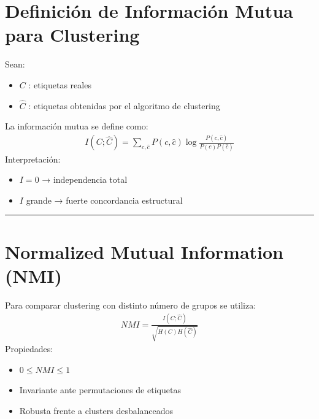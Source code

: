 \documentclass[letterpaper,10pt,english]{jupyterBook}
\begin{document}
\section{Definición de Información Mutua para Clustering}
\label{\detokenize{04_data_science_applications/clustering_mi:definicion-de-informacion-mutua-para-clustering}}
\sphinxAtStartPar
Sean:
\begin{itemize}
\item {} 
\sphinxAtStartPar
\(C\) : etiquetas reales

\item {} 
\sphinxAtStartPar
\(\hat{C}\) : etiquetas obtenidas por el algoritmo de clustering

\end{itemize}

\sphinxAtStartPar
La información mutua se define como:
\begin{equation*}
\begin{split}
I(C;\hat{C}) = \sum_{c,\hat{c}} P(c,\hat{c})
\log \frac{P(c,\hat{c})}{P(c)P(\hat{c})}
\end{split}
\end{equation*}
\sphinxAtStartPar
Interpretación:
\begin{itemize}
\item {} 
\sphinxAtStartPar
\(I=0\) → independencia total

\item {} 
\sphinxAtStartPar
\(I\) grande → fuerte concordancia estructural

\end{itemize}


\bigskip\hrule\bigskip



\section{Normalized Mutual Information (NMI)}
\label{\detokenize{04_data_science_applications/clustering_mi:normalized-mutual-information-nmi}}
\sphinxAtStartPar
Para comparar clustering con distinto número de grupos se utiliza:
\begin{equation*}
\begin{split}
NMI = \frac{I(C;\hat{C})}{\sqrt{H(C)H(\hat{C})}}
\end{split}
\end{equation*}
\sphinxAtStartPar
Propiedades:
\begin{itemize}
\item {} 
\sphinxAtStartPar
\(0 \leq NMI \leq 1\)

\item {} 
\sphinxAtStartPar
Invariante ante permutaciones de etiquetas

\item {} 
\sphinxAtStartPar
Robusta frente a clusters desbalanceados

\end{itemize}
\end{document}
